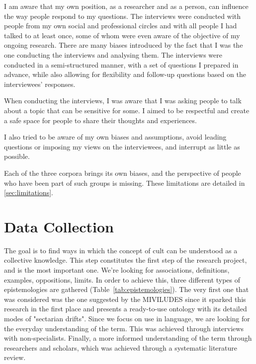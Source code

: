I am aware that my own position, as a researcher and as a person, can influence the way people respond to my questions. The interviews were conducted with people from my own social and professional circles and with all people I had talked to at least once, some of whom were even aware of the objective of my ongoing research. There are many biases introduced by the fact that I was the one conducting the interviews and analysing them. The interviews were conducted in a semi-structured manner, with a set of questions I prepared in advance, while also allowing for flexibility and follow-up questions based on the interviewees' responses.

When conducting the interviews, I was aware that I was asking people to talk about a topic that can be sensitive for some. I aimed to be respectful and create a safe space for people to share their thoughts and experiences.

I also tried to be aware of my own biases and assumptions, avoid leading questions or imposing my views on the interviewees, and interrupt as little as possible.

Each of the three corpora brings its own biases, and the perspective of people who have been part of such groups is missing. These limitations are detailed in \ref{sec:limitations}.

\section{Data Collection}
\label{sec:DataCollection}
The goal is to find ways in which the concept of cult can be understood as a collective knowledge. This step constitutes the first step of the research project, and is the most important one. We're looking for associations, definitions, examples, oppositions, limits. In order to achieve this, three different types of epistemologies are gathered (Table~\ref{tab:epistemologies}).
The very first one that was considered was the one suggested by the MIVILUDES since it sparked this research in the first place and presents a ready-to-use ontology with its detailed modes of "sectarian drifts".
Since we focus on use in language, we are looking for the everyday understanding of the term. This was achieved through interviews with non-specialists. Finally, a more informed understanding of the term through researchers and scholars, which was achieved through a systematic literature review.

